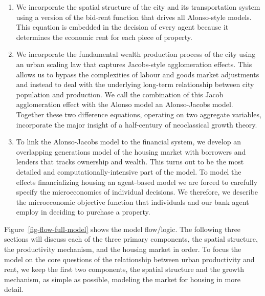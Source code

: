 \begin{enumerate}
\item We incorporate the spatial structure of the city and its transportation system using a version of the \gls{bid-rent function} that drives all Alonso-style models. This equation is embedded in the decision of every agent because it determines the economic rent for each piece of property.

\item We incorporate the fundamental wealth production process of the city using an \gls{urban scaling} law that captures Jacobs-style agglomeration effects. This allows us to bypass the complexities of labour and goods market adjustments and instead to deal with the underlying long-term relationship between city population and production. We call the combination of this Jacob agglomeration effect with the Alonso model an \gls{Alonso-Jacobs model}. Together these two difference equations, operating on two aggregate variables, incorporate the major insight of a half-century of \gls{neoclassical growth theory}.

\item To link the Alonso-Jacobs model to the financial system, we develop an \gls{overlapping generations} model of the housing market with borrowers and lenders that tracks ownership and wealth. This turns out to be the most detailed and computationally-intensive part of the model. To model the effects financializing housing an \gls{agent-based model} we are forced to carefully specify the microeconomics of individual decisions. %
We therefore, we describe the microeconomic objective function that individuals and our bank agent employ in deciding to purchase a property. 
\end{enumerate}

Figure~\ref{fig-flow-full-model} shows the model flow/logic.  The following three sections will discuss each of the three primary components, the spatial structure, the productivity mechanism, and the housing market in order.  To focus the model on the core questions of the relationship between urban productivity and rent, we keep the first two components,  the spatial structure and the growth mechanism,  as simple as possible, modeling the market for housing in more detail. 


